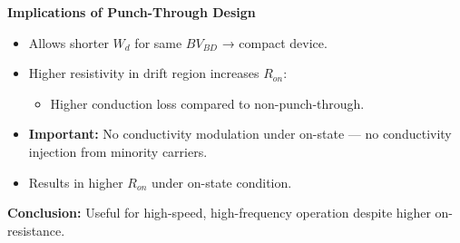 \begin{frame}{\textbf{Implications of Punch-Through Design}}
    \begin{itemize}
        \item Allows shorter $W_d$ for same $BV_{BD}$ → compact device.
        \item Higher resistivity in drift region increases $R_{on}$:
        \begin{itemize}
            \item Higher conduction loss compared to non-punch-through.
        \end{itemize}
        \item \textbf{Important:} No conductivity modulation under on-state — no conductivity injection from minority carriers.
        \item Results in higher $R_{on}$ under on-state condition.
    \end{itemize}
    \textbf{Conclusion:} Useful for high-speed, high-frequency operation despite higher on-resistance.
\end{frame}

